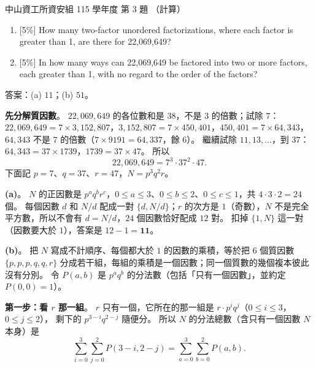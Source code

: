 \begin{pastexam}[label={px:nsysu-115-dmalg-02}]{中山資工所資安組 115 學年度 第 3 題}
（計算）

\begin{enumerate}[label=(\alph*)]
\item {[}5\%{]} How many two-factor unordered factorizations, where each factor is greater than 1, are there for 22,069,649?
\item {[}5\%{]} In how many ways can 22,069,649 be factored into two or more factors, each greater than 1, with no regard to the order of the factors?
\end{enumerate}
\end{pastexam}

\begin{pastsoln}
答案：(a) $11$；(b) $51$。

\textbf{先分解質因數}。 $22{,}069{,}649$ 的各位數和是 $38$，不是 $3$ 的倍數；試除 $7$：
$22{,}069{,}649 = 7 \times 3{,}152{,}807$，$3{,}152{,}807 = 7 \times 450{,}401$，$450{,}401 = 7 \times 64{,}343$，
$64{,}343$ 不是 $7$ 的倍數（$7 \times 9191 = 64{,}337$，餘 $6$）。 繼續試除 $11, 13, \ldots$，到 $37$：
$64{,}343 = 37 \times 1739$，$1739 = 37 \times 47$。 所以
\[
22{,}069{,}649 = 7^3 \cdot 37^2 \cdot 47 .
\]
下面記 $p = 7$、$q = 37$、$r = 47$，$N = p^3 q^2 r$。

\textbf{(a)}。 $N$ 的正因數是 $p^a q^b r^c$，$0 \le a \le 3$、$0 \le b \le 2$、$0 \le c \le 1$，共
$4 \cdot 3 \cdot 2 = 24$ 個。 每個因數 $d$ 和 $N/d$ 配成一對 $\{d, N/d\}$；$r$ 的次方是 $1$（奇數），$N$ 不是完全
平方數，所以不會有 $d = N/d$，$24$ 個因數恰好配成 $12$ 對。 扣掉 $\{1, N\}$ 這一對（因數要大於 $1$），答案是
$12 - 1 = \mathbf{11}$。

\textbf{(b)}。 把 $N$ 寫成不計順序、每個都大於 $1$ 的因數的乘積，等於把 $6$ 個質因數
$\{p, p, p, q, q, r\}$ 分成若干組，每組的乘積是一個因數；同一個質數的幾個複本彼此沒有分別。 令 $P(a, b)$ 是
$p^a q^b$ 的分法數（包括「只有一個因數」，並約定 $P(0, 0) = 1$）。

\textbf{第一步：看 $r$ 那一組}。 $r$ 只有一個，它所在的那一組是 $r \cdot p^i q^j$（$0 \le i \le 3$，$0 \le j \le 2$），
剩下的 $p^{3-i} q^{2-j}$ 隨便分。 所以 $N$ 的分法總數（含只有一個因數 $N$ 本身）是
\[
\sum_{i=0}^{3} \sum_{j=0}^{2} P(3 - i, 2 - j) = \sum_{a=0}^{3} \sum_{b=0}^{2} P(a, b).
\]


\end{pastsoln}
